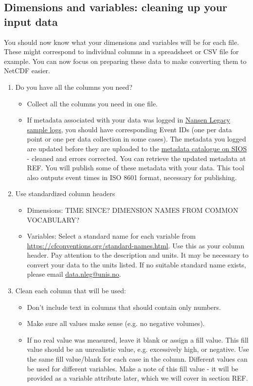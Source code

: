 \documentclass[a4paper,english, 11pt]{article}
\makeatletter
\newcommand{\emailme}{\href{mailto:data.nleg@unis.no}{data.nleg@unis.no}}
\makeatother
\begin{document}
\subsection{Dimensions and variables: cleaning up your input data}
\label{ss:dimensionsvariables}

You should now know what your dimensions and variables will be for each file. These might correspond to individual columns in a spreadsheet or CSV file for example. You can now focus on preparing these data to make converting them to NetCDF easier.

\begin{enumerate}
\item Do you have all the columns you need?
\begin{itemize}
\item Collect all the columns you need in one file.
\item If metadata associated with your data was logged in \href{https://sios-svalbard.org/cgi-bin/darwinsheet/?setup=aen}{Nansen Legacy sample logs}, you should have corresponding Event IDs (one per data point or one per data collection in some cases). The metadata you logged are updated before they are uploaded to the \href{https://sios-svalbard.org/aen/tools}{metadata catalogue on SIOS} - cleaned and errors corrected. You can retrieve the updated metadata at REF. You will publish some of these metadata with your data. This tool also outputs event times in ISO 8601 format, necessary for publishing.    
\end{itemize}
\item Use standardized column headers
\begin{itemize}
\item Dimensions: 
TIME SINCE? DIMENSION NAMES FROM COMMON VOCABULARY?
\item Variables:
Select a standard name for each variable from \url{https://cfconventions.org/standard-names.html}. Use this as your column header. Pay attention to the description and units. It may be necessary to convert your data to the units listed. If no suitable standard name exists, please email \emailme.  
\end{itemize}
\item Clean each column that will be used:
\begin{itemize}
\item Don't include text in columns that should contain only numbers.
\item Make sure all values make sense (e.g. no negative volumes).
\item If no real value was measured, leave it blank or assign a fill value. This fill value should be an unrealistic value, e.g. excessively high, or negative. Use the same fill value/blank for each case in the column. Different values can be used for different variables. Make a note of this fill value - it will be provided as a variable attribute later, which we will cover in section REF.
\end{itemize}
\end{enumerate}
\end{document}
